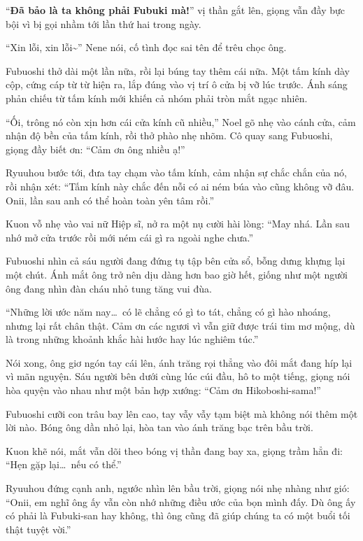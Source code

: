 \documentclass[../main.tex]{subfiles}
\begin{document}
``\textbf{Đã bảo là ta không phải Fubuki mà!}'' vị thần gắt lên, giọng vẫn đầy bực bội vì bị gọi nhầm tới lần thứ hai trong ngày.

``Xin lỗi, xin lỗi\~{}'' Nene nói, cố tình đọc sai tên để trêu chọc ông.

Fubuoshi thở dài một lần nữa, rồi lại búng tay thêm cái nữa. Một tấm kính dày cộp, cứng cáp từ từ hiện ra, lắp đúng vào vị trí ô cửa bị vỡ lúc trước. Ánh sáng phản chiếu từ tấm kính mới khiến cả nhóm phải tròn mắt ngạc nhiên.

``Ối, trông nó còn xịn hơn cái cửa kính cũ nhiều,'' Noel gõ nhẹ vào cánh cửa, cảm nhận độ bền của tấm kính, rồi thở phào nhẹ nhõm. Cô quay sang Fubuoshi, giọng đầy biết ơn: ``Cảm ơn ông nhiều ạ!''

Ryuuhou bước tới, đưa tay chạm vào tấm kính, cảm nhận sự chắc chắn của nó, rồi nhận xét: ``Tấm kính này chắc đến nỗi có ai ném búa vào cũng không vỡ đâu. Onii, lần sau anh có thể hoàn toàn yên tâm rồi.''

Kuon vỗ nhẹ vào vai nữ Hiệp sĩ, nở ra một nụ cười hài lòng: ``May nhá. Lần sau nhớ mở cửa trước rồi mới ném cái gì ra ngoài nghe chưa.''

Fubuoshi nhìn cả sáu người đang đứng tụ tập bên cửa sổ, bỗng dưng khựng lại một chút. Ánh mắt ông trở nên dịu dàng hơn bao giờ hết, giống như một người ông đang nhìn đàn cháu nhỏ tung tăng vui đùa.

``Những lời ước năm nay\dots\ có lẽ chẳng có gì to tát, chẳng có gì hào nhoáng, nhưng lại rất chân thật. Cảm ơn các ngươi vì vẫn giữ được trái tim mơ mộng, dù là trong những khoảnh khắc hài hước hay lúc nghiêm túc.''

Nói xong, ông giơ ngón tay cái lên, ánh trăng rọi thẳng vào đôi mắt đang híp lại vì mãn nguyện. Sáu người bên dưới cùng lúc cúi đầu, hô to một tiếng, giọng nói hòa quyện vào nhau như một bản hợp xướng: ``Cảm ơn Hikoboshi-sama!''

Fubuoshi cưỡi con trâu bay lên cao, tay vẫy vẫy tạm biệt mà không nói thêm một lời nào. Bóng ông dần nhỏ lại, hòa tan vào ánh trăng bạc trên bầu trời.

Kuon khẽ nói, mắt vẫn dõi theo bóng vị thần đang bay xa, giọng trầm hẳn đi: ``Hẹn gặp lại\dots\ nếu có thể.''

Ryuuhou đứng cạnh anh, ngước nhìn lên bầu trời, giọng nói nhẹ nhàng như gió: ``Onii, em nghĩ ông ấy vẫn còn nhớ những điều ước của bọn mình đấy. Dù ông ấy có phải là Fubuki-san hay không, thì ông cũng đã giúp chúng ta có một buổi tối thật tuyệt vời.''
\end{document}
